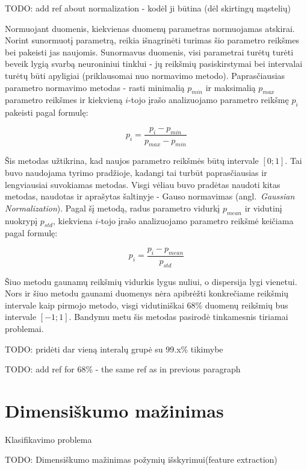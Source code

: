 \documentclass{VUMIFPSbakalaurinis}
\newcommand{\TODO}[1]{
\colorbox{todo-background-color}{TODO: #1}
}
\begin{document}
\TODO{add ref about normalization - kodėl ji būtina (dėl skirtingų mąstelių)}

Normuojant duomenis, kiekvienas duomenų parametras normuojamas atskirai.
Norint sunormuotį parametrą, reikia išnagrinėti turimas šio parametro reikšmes bei pakeisti jas naujomis.
Sunormavus duomenis, visi parametrai turėtų turėti beveik lygią svarbą neuroniniui tinklui - jų reikšmių pasiskirstymai bei intervalai turėtų būti apyligiai (priklausomai nuo normavimo metodo).
Paprasčiausias parametro normavimo metodas - rasti minimalią $p_{min}$ ir maksimalią $p_{max}$ parametro reikšmes ir kiekvieną $i$-tojo įrašo analizuojamo parametro reikšmę $p_i$ pakeisti pagal formulę:

\begin{equation}
p_i = \frac{p_i - p_{min}}{p_{max} - p_{min}}
\end{equation}

Šis metodas užtikrina, kad naujos parametro reikšmės būtų intervale $[0; 1]$.
Tai buvo naudojama tyrimo pradžioje, kadangi tai turbūt paprasčiausias ir lengviausiai suvokiamas metodas.
Visgi vėliau buvo pradėtas naudoti kitas metodas, naudotas ir aprašytas \cite{gaussian} šaltinyje - Gauso normavimas (angl.~\textit{Gaussian Normalization}).
Pagal šį metodą, radus parametro vidurkį $p_{mean}$ ir vidutinį nuokrypį $p_{std}$, kiekviena $i$-tojo įrašo analizuojamo parametro reikšmė keičiama pagal formulę:

\begin{equation}
p_i = \frac{p_i - p_{mean}}{p_{std}}
\end{equation}

Šiuo metodu gaunamų reikšmių vidurkis lygus nuliui, o dispersija lygi vienetui.
Nors ir šiuo metodu gaunami duomenys nėra apibrėžti konkrečiame reikšmių intervale kaip pirmojo metodo, visgi vidutiniškai 68\% duomenų reikšmių bus intervale $[-1; 1]$.
Bandymu metu šis metodas pasirodė tinkamesnis tiriamai problemai.

\TODO{pridėti dar vieną interalų grupė su 99.x\% tikimybe}

\TODO{add ref for 68\% - the same ref as in previous paragraph}



\section{Dimensiškumo mažinimas}

Klasifikavimo problema

\TODO{Dimensiškumo mažinimas požymių išskyrimui(feature extraction)}
\end{document}
